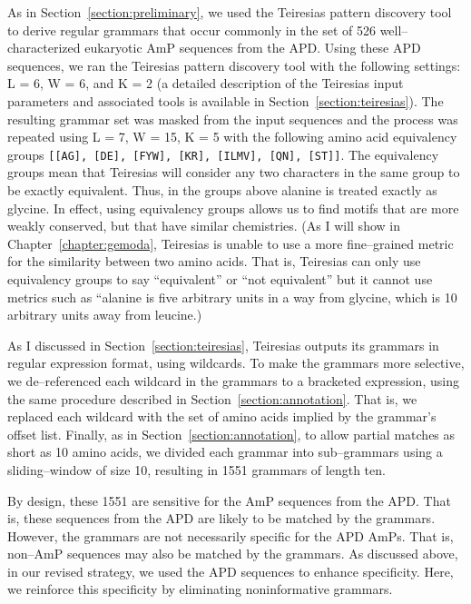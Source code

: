     As in Section~\vref{section:preliminary},
    we used the Teiresias pattern
    discovery tool to derive regular grammars that occur commonly
    in the set of 526 well--characterized eukaryotic AmP
    sequences from the APD\@.
    Using these APD sequences, we ran the Teiresias pattern discovery
    tool with the following settings: L = 6, W =
    6, and K = 2 (a detailed description of the
    Teiresias input parameters and associated tools
    is available in Section~\vref{section:teiresias}). The resulting grammar
    set was masked from the input sequences and the
    process was repeated using L = 7, W = 15, K = 5
    with the following amino acid equivalency groups
    \texttt{[[AG], [DE], [FYW], [KR], [ILMV], [QN], [ST]]}.
    The equivalency groups mean that Teiresias will consider any two
    characters in the same group to be exactly equivalent.  Thus, in
    the groups above alanine is treated exactly as glycine.  In
    effect, using equivalency groups allows us to find motifs that
    are more weakly conserved, but that have similar chemistries.
    (As I will show in Chapter~\vref{chapter:gemoda}, Teiresias
    is unable to use a more fine--grained metric for the similarity
    between two amino acids.  That is, Teiresias can only use
    equivalency groups to say ``equivalent'' or ``not equivalent''
    but it cannot use metrics such as ``alanine is five arbitrary
    units in a way from glycine, which is 10 arbitrary units away
    from leucine.)

As I discussed in Section~\vref{section:teiresias}, Teiresias
outputs its grammars in regular expression format, using wildcards.
To make the grammars more selective, we de--referenced each wildcard
in the grammars to a bracketed expression, using the same procedure
described in Section~\vref{section:annotation}. That is, we replaced
each wildcard with the set of amino acids implied by the grammar's
offset list. Finally, as in Section~\ref{section:annotation}, to
allow partial matches as short as 10 amino acids, we divided each
grammar into sub--grammars using a sliding--window of size 10,
resulting in 1551 grammars of length ten.

By design, these 1551 are sensitive for the AmP sequences from the
APD\@.  That is, these sequences from the APD are likely to be
matched by the grammars.  However, the grammars are not necessarily
specific for the APD AmPs. That is, non--AmP sequences may also be
matched by the grammars.  As discussed above, in our revised
strategy, we used the APD sequences to enhance specificity.  Here,
we reinforce this specificity by eliminating noninformative
grammars.

